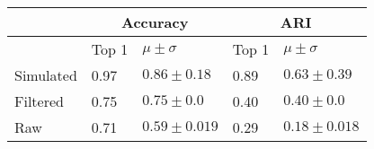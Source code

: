 \begin{tabular}{lllll}
\toprule
{} & \multicolumn{2}{c}{Accuracy} &   \multicolumn{2}{c}{ARI} \\
\midrule
{} & Top 1 & $\mu \pm \sigma$ & Top 1 & $\mu \pm \sigma$ \\
Simulated &  0.97 &  $0.86 \pm 0.18 $ &  0.89 & $0.63 \pm 0.39 $ \\
Filtered  &   0.75  & $0.75 \pm 0.0$ &  0.40 & $0.40 \pm 0.0$ \\
Raw &   0.71 &  $0.59\pm 0.019$ & 0.29 & $0.18\pm 0.018$ \\
\bottomrule
\end{tabular}
